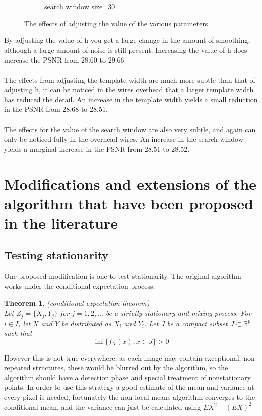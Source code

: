 \documentclass[11pt]{article}
\newtheorem{theorem}{Theorem}
\begin{document}
\begin{figure}[H]
\begin{subfigure}{.24\textwidth}
		\caption{search window size=30}
		\label{fig:search30}
	\end{subfigure}
	\caption{The effects of adjusting the value of the various parameters}
	\label{fig:parameters}
\end{figure}
By adjusting the value of h you get a large change in the amount of smoothing, although a large amount of noise is still present. Increasing the value of h does increase the PSNR from 28.60 to 29.66\\
\\
The effects from adjusting the template width are much more subtle than that of adjusting h, it can be noticed in the wires overhead that a larger template width has reduced the detail. An increase in the template width yields a small reduction in the PSNR from 28.68 to 28.51.\\
\\
The effects for the value of the search window are also very subtle, and again can only be noticed fully in the overhead wires. An increase in the search window yields a marginal increase in the PSNR from 28.51 to 28.52.


\section{Modifications and extensions of the algorithm that have been proposed in the literature}
\subsection{Testing stationarity}
\cite{buades_review_2005} One proposed modification is one to test stationarity. The original algorithm works under the conditional expectation process:
\begin{theorem}
(conditional expectation theorem)\\
Let $Z_j=\{X_j,Y_j\}$ for $j=1,2,...$ be a strictly stationary and mixing process. For $i\in I$, let $X$ and $Y$ be distributed as $X_i$ and $Y_i$. Let J be a compact subset $J\subset \mathbb{R}^p$ such that
$$\inf\{f_X(x);x\in J\}>0$$
\end{theorem}
However this is not true everywhere, as each image may contain exceptional, non-repeated structures, these would be blurred out by the algorithm, so the algorithm should have a detection phase and special treatment of nonstationary points. In order to use this strategy a good estimate of the mean and variance at every pixel is needed, fortunately the non-local means algorithm converges to the conditional mean, and the variance can just be calculated using $EX^2-(EX)^2$
\newpage
\end{document}
